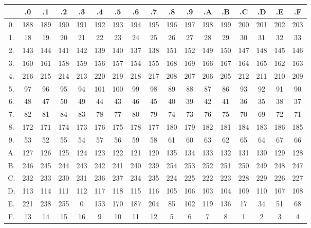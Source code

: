 \begin{table}
  \centering
  \footnotesize
  \renewcommand\tabcolsep{3pt}
  \renewcommand\arraystretch{1.2}
  \begin{tabular}{c|cccccccccccccccc}
    & .0 & .1 & .2 & .3 & .4 & .5 & .6 & .7 & .8 & .9 & .A & .B & .C & .D & .E & .F \\
    \hline
    0. & 188 &  189 & 190 & 191 & 192 & 193 & 194 & 195 & 196 & 197 & 198 & 199 & 200 & 201 & 202 & 203 \\
    1. &  18 &   19 &  20 &  21 &  22 &  23 &  24 &  25 &  26 &  27 &  28 &  29 &  30 &  31 &  32 &  33 \\
    2. & 143 &  144 & 141 & 142 & 139 & 140 & 137 & 138 & 151 & 152 & 149 & 150 & 147 & 148 & 145 & 146 \\
    3. & 160 &  161 & 158 & 159 & 156 & 157 & 154 & 155 & 168 & 169 & 166 & 167 & 164 & 165 & 162 & 163 \\
    4. & 216 &  215 & 214 & 213 & 220 & 219 & 218 & 217 & 208 & 207 & 206 & 205 & 212 & 211 & 210 & 209 \\
    5. &  97 &   96 &  95 &  94 & 101 & 100 &  99 &  98 &  89 &  88 &  87 &  86 &  93 &  92 &  91 &  90 \\
    6. &  48 &   47 &  50 &  49 &  44 &  43 &  46 &  45 &  40 &  39 &  42 &  41 &  36 &  35 &  38 &  37 \\
    7. &  82 &   81 &  84 &  83 &  78 &  77 &  80 &  79 &  74 &  73 &  76 &  75 &  70 &  69 &  72 &  71 \\
    8. & 172 &  171 & 174 & 173 & 176 & 175 & 178 & 177 & 180 & 179 & 182 & 181 & 184 & 183 & 186 & 185 \\
    9. &  53 &   52 &  55 &  54 &  57 &  56 &  59 &  58 &  61 &  60 &  63 &  62 &  65 &  64 &  67 &  66 \\
    A. & 127 &  126 & 125 & 124 & 123 & 122 & 121 & 120 & 135 & 134 & 133 & 132 & 131 & 130 & 129 & 128 \\
    B. & 246 &  245 & 244 & 243 & 242 & 241 & 240 & 239 & 254 & 253 & 252 & 251 & 250 & 249 & 248 & 247 \\
    C. & 232 &  233 & 230 & 231 & 236 & 237 & 234 & 235 & 224 & 225 & 222 & 223 & 228 & 229 & 226 & 227 \\
    D. & 113 &  114 & 111 & 112 & 117 & 118 & 115 & 116 & 105 & 106 & 103 & 104 & 109 & 110 & 107 & 108 \\
    E. & 221 &  238 & 255 &   0 & 153 & 170 & 187 & 204 &  85 & 102 & 119 & 136 &  17 &  34 &  51 &  68 \\
    F. &  13 &   14 &  15 &  16 &   9 &  10 &  11 &  12 &   5 &   6 &   7 &   8 &   1 &   2 &   3 &   4 \\
  \end{tabular}
\end{table}